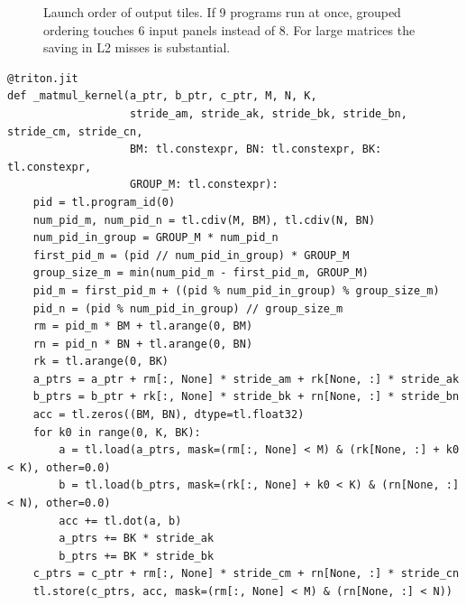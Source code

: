 \begin{figure}[t]
\centering
{}
\caption{Launch order of output tiles. If 9 programs run at once, grouped ordering
touches 6 input panels instead of 8. For large matrices the saving in L2 misses is
substantial.}
\label{fig:triton:swizzle}
\end{figure}

\begin{lstlisting}[caption={Grouped, tiled matmul. \ident{tl.dot} compiles to tensor-core
MMA instructions on GPUs.},label={lst:triton:matmul}]
@triton.jit
def _matmul_kernel(a_ptr, b_ptr, c_ptr, M, N, K,
                   stride_am, stride_ak, stride_bk, stride_bn, stride_cm, stride_cn,
                   BM: tl.constexpr, BN: tl.constexpr, BK: tl.constexpr,
                   GROUP_M: tl.constexpr):
    pid = tl.program_id(0)
    num_pid_m, num_pid_n = tl.cdiv(M, BM), tl.cdiv(N, BN)
    num_pid_in_group = GROUP_M * num_pid_n
    first_pid_m = (pid // num_pid_in_group) * GROUP_M
    group_size_m = min(num_pid_m - first_pid_m, GROUP_M)
    pid_m = first_pid_m + ((pid % num_pid_in_group) % group_size_m)
    pid_n = (pid % num_pid_in_group) // group_size_m
    rm = pid_m * BM + tl.arange(0, BM)
    rn = pid_n * BN + tl.arange(0, BN)
    rk = tl.arange(0, BK)
    a_ptrs = a_ptr + rm[:, None] * stride_am + rk[None, :] * stride_ak
    b_ptrs = b_ptr + rk[:, None] * stride_bk + rn[None, :] * stride_bn
    acc = tl.zeros((BM, BN), dtype=tl.float32)
    for k0 in range(0, K, BK):
        a = tl.load(a_ptrs, mask=(rm[:, None] < M) & (rk[None, :] + k0 < K), other=0.0)
        b = tl.load(b_ptrs, mask=(rk[:, None] + k0 < K) & (rn[None, :] < N), other=0.0)
        acc += tl.dot(a, b)
        a_ptrs += BK * stride_ak
        b_ptrs += BK * stride_bk
    c_ptrs = c_ptr + rm[:, None] * stride_cm + rn[None, :] * stride_cn
    tl.store(c_ptrs, acc, mask=(rm[:, None] < M) & (rn[None, :] < N))
\end{lstlisting}

